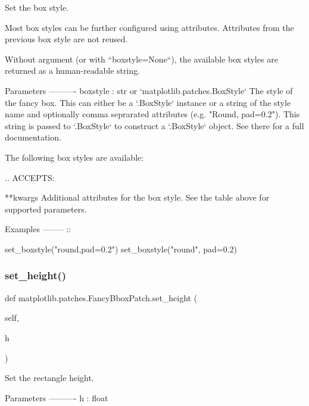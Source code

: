 \begin{DoxyVerb}Set the box style.

Most box styles can be further configured using attributes.
Attributes from the previous box style are not reused.

Without argument (or with ``boxstyle=None``), the available box styles
are returned as a human-readable string.

Parameters
----------
boxstyle : str or `matplotlib.patches.BoxStyle`
    The style of the fancy box. This can either be a `.BoxStyle`
    instance or a string of the style name and optionally comma
    seprarated attributes (e.g. "Round, pad=0.2"). This string is
    passed to `.BoxStyle` to construct a `.BoxStyle` object. See
    there for a full documentation.

    The following box styles are available:


    .. ACCEPTS: %

**kwargs
    Additional attributes for the box style. See the table above for
    supported parameters.

Examples
--------
::

    set_boxstyle("round,pad=0.2")
    set_boxstyle("round", pad=0.2)\end{DoxyVerb}
 \mbox{\label{classmatplotlib_1_1patches_1_1FancyBboxPatch_a0d147b5a2822fa08d7a17d9da0148a1e}} 
\subsubsection{\texorpdfstring{set\+\_\+height()}{set\_height()}}
{\footnotesize\ttfamily def matplotlib.\+patches.\+Fancy\+Bbox\+Patch.\+set\+\_\+height (\begin{DoxyParamCaption}\item[{}]{self,  }\item[{}]{h }\end{DoxyParamCaption})}

\begin{DoxyVerb}Set the rectangle height.

Parameters
----------
h : float
\end{DoxyVerb}
 \mbox{\label{classmatplotlib_1_1patches_1_1FancyBboxPatch_aff9304f049d9dc36c4565cc8890d6803}} 
